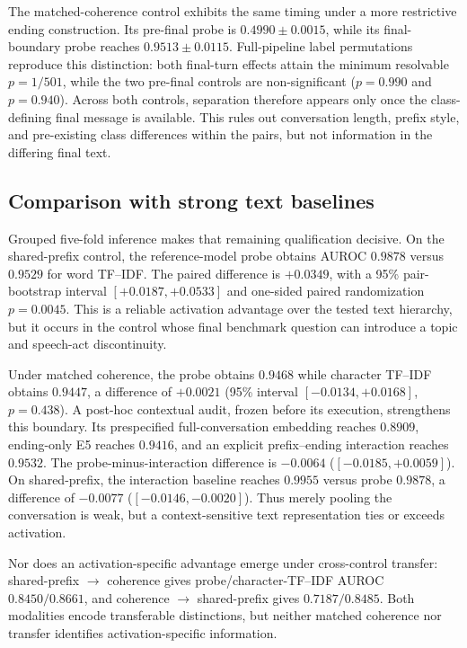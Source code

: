 \documentclass{article}
\begin{document}
The matched-coherence control exhibits the same timing under a more restrictive
ending construction. Its pre-final probe is
$0.4990\mathbin{\pm}0.0015$, while its final-boundary probe reaches
$0.9513\mathbin{\pm}0.0115$. Full-pipeline label permutations reproduce this
distinction: both final-turn effects attain the minimum resolvable
$p=1/501$, while the two pre-final controls are non-significant
($p=0.990$ and $p=0.940$). Across both controls, separation therefore appears
only once the class-defining final message is available. This rules out
conversation length, prefix style, and pre-existing class differences within
the pairs, but not information in the differing final text.

\subsection{Comparison with strong text baselines}

Grouped five-fold inference makes that remaining qualification decisive. On
the shared-prefix control, the reference-model probe obtains AUROC $0.9878$
versus $0.9529$ for word TF--IDF. The paired difference is $+0.0349$, with a
95\% pair-bootstrap interval $[+0.0187,+0.0533]$ and one-sided paired
randomization $p=0.0045$. This is a reliable activation advantage over the
tested text hierarchy, but it occurs in the control whose final benchmark
question can introduce a topic and speech-act discontinuity.

Under matched coherence, the probe obtains $0.9468$ while character TF--IDF
obtains $0.9447$, a difference of $+0.0021$ (95\% interval
$[-0.0134,+0.0168]$, $p=0.438$). A post-hoc contextual audit, frozen before its
execution, strengthens this boundary. Its prespecified full-conversation
embedding reaches $0.8909$, ending-only E5 reaches $0.9416$, and an explicit
prefix--ending interaction reaches $0.9532$. The probe-minus-interaction
difference is $-0.0064$ ($[-0.0185,+0.0059]$). On shared-prefix, the interaction
baseline reaches $0.9955$ versus probe $0.9878$, a difference of $-0.0077$
($[-0.0146,-0.0020]$). Thus merely pooling the conversation is weak, but a
context-sensitive text representation ties or exceeds activation.

Nor does an activation-specific advantage emerge under cross-control transfer:
shared-prefix $\rightarrow$ coherence gives probe/character-TF--IDF AUROC
$0.8450/0.8661$, and coherence $\rightarrow$ shared-prefix gives
$0.7187/0.8485$. Both modalities encode transferable distinctions, but neither
matched coherence nor transfer identifies activation-specific information.
\end{document}
